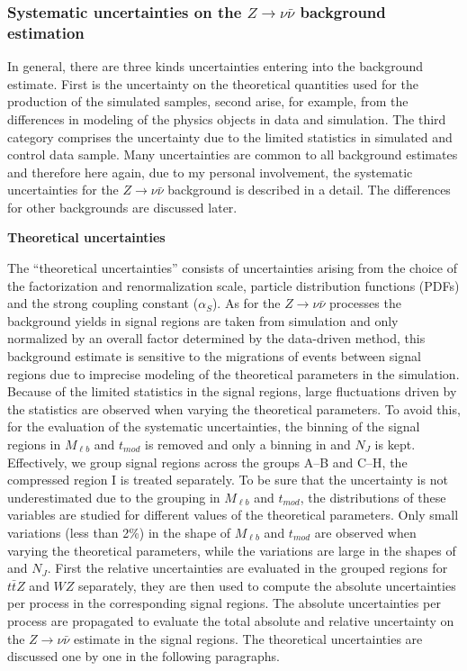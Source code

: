 \subsubsection{Systematic uncertainties on the $Z \to \nu \bar{\nu}$ background estimation}


In general, there are three kinds uncertainties entering into the background estimate. First is the uncertainty on the theoretical quantities used for the production of the simulated samples, second arise, for example, from the differences in modeling of the physics objects in data and simulation. The third category comprises the uncertainty due to the limited statistics in simulated and control data sample. Many uncertainties are common to all background estimates and therefore here again, due to my personal involvement, the systematic uncertainties for the $Z \to \nu \bar{\nu}$ background is described in a detail. The differences for other backgrounds are discussed later.

\textbf{Theoretical uncertainties}

The  ``theoretical uncertainties'' consists of uncertainties arising from the choice of the factorization and renormalization scale, particle distribution functions (PDFs) and the strong coupling constant ($\alpha_{S}$). As for the $Z \to \nu  \bar{\nu}$ processes the background yields in signal regions are taken from simulation and only normalized by an overall factor determined by the data-driven method, this background estimate is sensitive to the migrations of events between signal regions due to imprecise modeling of the theoretical parameters in the simulation. Because of the limited statistics in the signal regions, large fluctuations driven by the statistics are observed when varying the theoretical parameters. To avoid this, for the evaluation of the systematic uncertainties, the binning of the signal regions in $M_{\ell b}$ and $t_{mod}$ is removed and only a binning in \MET and $N_{J}$ is kept. Effectively, we group signal regions across the groups A--B and C--H, the compressed region I is treated separately. To be sure that the uncertainty is not underestimated due to the grouping in $M_{\ell b}$ and $t_{mod}$, the distributions of these variables are studied for different values of the theoretical parameters. Only small variations (less than 2\%) in the shape of $M_{\ell b}$ and $t_{mod}$ are observed when varying the theoretical parameters, while the variations are large in the shapes of \MET and $N_{J}$.  First the relative uncertainties are evaluated in the grouped regions for $t\bar{t}Z$ and $WZ$ separately, they are then used to compute the absolute uncertainties per process in the corresponding signal regions. The absolute uncertainties per process are propagated to evaluate the total absolute and relative uncertainty on the $Z \to \nu \bar{\nu}$ estimate in the signal regions.  The theoretical uncertainties are discussed one by one in the following paragraphs.


